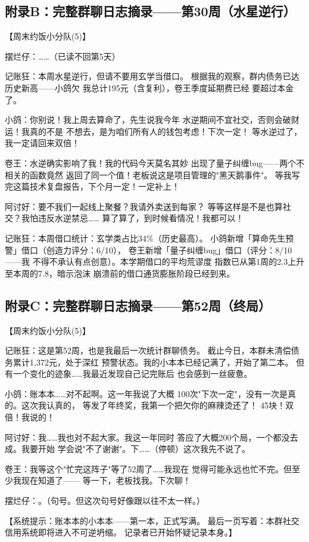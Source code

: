 \documentclass[journal]{IEEEtran}
\begin{document}
\subsection*{附录B：完整群聊日志摘录——第30周（水星逆行）}
\label{app:chat_week30}

\begin{chatbox}
【周末约饭小分队(5)】

摆烂仔：……（已读不回第5天）

记账狂：本周水星逆行，但请不要用玄学当借口。
根据我的观察，群内债务已达历史新高——小鸽欠
我总计195元（含复利），卷王季度延期费已经
要超过本金了。

小鸽：你别说！我上周去算命了，先生说我今年
水逆期间不宜社交，否则会破财运！我真的不是
不想去，是为咱们所有人的钱包考虑！下次一定！
等水逆过了，我一定请回来双倍！

卷王：水逆确实影响了我！我的代码今天莫名其妙
出现了量子纠缠bug——两个不相关的函数竟然
返回了同一个值！老板说这是项目管理的"黑天鹅事件"。
等我写完这篇技术复盘报告，下个月一定！一定补上！

阿讨好：要不我们一起线上聚餐？我请外卖送到每家？
等等这样是不是也算社交？我怕违反水逆禁忌……
算了算了，到时候看情况！我都可以！

记账狂：本周借口统计：玄学类占比34\%（历史最高）。
小鸽新增「算命先生预警」借口（创造力评分：6/10），
卷王新增「量子纠缠bug」借口（评分：8/10——我
不得不承认有点创意）。本学期借口的平均荒谬度
指数已从第1周的2.3上升至本周的7.8，暗示泡沫
崩溃前的借口通货膨胀阶段已经到来。
\end{chatbox}

\subsection*{附录C：完整群聊日志摘录——第52周（终局）}
\label{app:chat_week52}

\begin{chatbox}
【周末约饭小分队(5)】

记账狂：这是第52周，也是我最后一次统计群聊债务。
截止今日，本群未清偿债务累计1,372元，处于深红
预警状态。我的小本本已经记满了，开始了第二本。
但有一个变化的迹象……我最近发现自己记完账后
也会感到一丝疲惫。

小鸽：账本本……对不起啊。这一年我说了大概
100次"下次一定"，没有一次是真的。这次我认真的，
等发了年终奖，我第一个把欠你的麻辣烫还了！
45块！双倍！我说的！

阿讨好：我……我也对不起大家。我这一年同时
答应了大概200个局，一个都没去成。我要开始
学会说"不了谢谢"。下……（停顿）这次我先不说了。

卷王：我等这个"忙完这阵子"等了52周了……我现在
觉得可能永远也忙不完。但至少我现在知道了——
等一下，老板找我。下次聊！

摆烂仔：。（句号。但这次句号好像跟以往不太一样。）

【系统提示：账本本的小本本——第一本，正式写满。
最后一页写着：本群社交信用系统即将进入不可逆坍缩。
记录者已开始怀疑记录本身。】
\end{chatbox}
\end{document}
